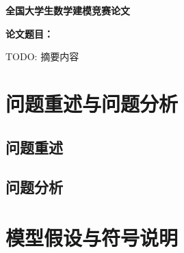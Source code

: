 



\begin{titlepage}
  \centering
  \vspace*{2cm}
  {\LARGE\bfseries 全国大学生数学建模竞赛论文\par}
  \vspace{1.5cm}
  {\Large\bfseries 论文题目：\underline{\hspace{8cm}}\par}
  \vspace{2cm}

  \begin{cnabstract}
    TODO: 摘要内容
  \end{cnabstract}


  \vfill
\end{titlepage}

\tableofcontents
\newpage

\section{问题重述与问题分析}

\subsection{问题重述}

\subsection{问题分析}

\section{模型假设与符号说明}


